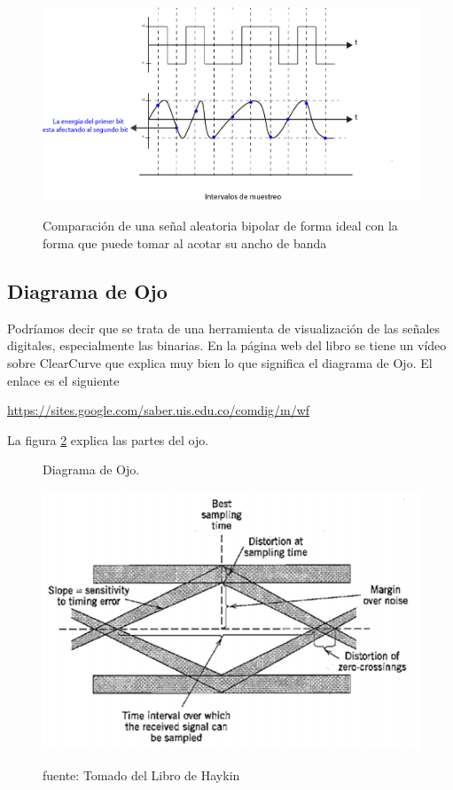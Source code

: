 \begin{figure}[h!]
	\captionsetup{justification = raggedright, singlelinecheck = false}
	\caption{Comparación de una señal aleatoria bipolar de forma ideal con la forma que puede tomar al acotar su ancho de banda} 	\centering
	\includegraphics[scale=0.3]{Imagenes/Intervalos.png}
	\label{fig:Intervalos}
\end{figure}

\subsection{Diagrama de Ojo}
Podríamos decir que se trata de una herramienta de visualización de las señales digitales, especialmente las binarias. En la página web del libro se tiene un vídeo sobre ClearCurve que explica muy bien lo que significa el diagrama de Ojo. El enlace es el siguiente

\begin{center}
\url{https://sites.google.com/saber.uis.edu.co/comdig/m/wf} 
\end{center}
La figura \ref{fig:Ojo} explica las partes del ojo.

\begin{figure}[h!]
	\captionsetup{justification = raggedright, singlelinecheck = false}
	\caption{Diagrama de Ojo.} 
	\centering
	\includegraphics[scale=0.8]{Imagenes/Ojo.png}
	\label{fig:Ojo}
		\caption*{fuente: Tomado del Libro de Haykin}
\end{figure}



